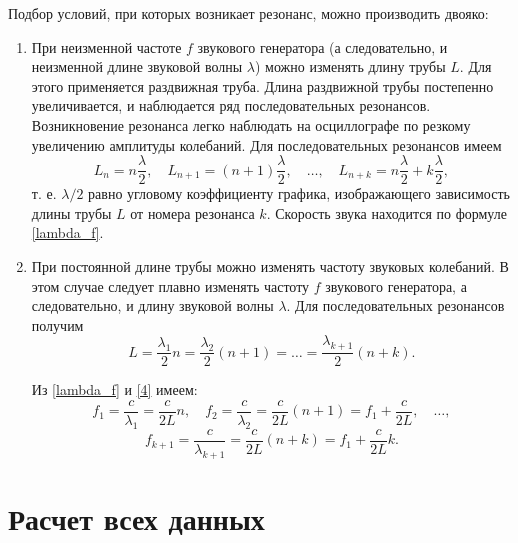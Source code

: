 \documentclass[a4paper, 12pt]{article}
\begin{document}
	Подбор условий, при которых возникает резонанс, можно производить двояко:
	\begin{enumerate}
		\item При неизменной частоте $ f $ звукового генератора (а следовательно, и неизменной длине звуковой волны $ \lambda $) можно изменять длину трубы $ L $. Для этого применяется раздвижная труба. Длина раздвижной трубы постепенно увеличивается, и наблюдается ряд последовательных резонансов. Возникновение резонанса легко наблюдать на осциллографе по резкому увеличению амплитуды колебаний. Для последовательных резонансов имеем \begin{equation}\label{first}
			L_n=n\frac{\lambda}{2}, \quad L_{n+1}=(n+1)\frac{\lambda}{2}, \quad \dots, \quad L_{n+k} = n\frac{\lambda}{2}+k\frac{\lambda}{2},
		\end{equation} т. е. $ \lambda/2 $ равно угловому коэффициенту графика, изображающего зависимость длины трубы $ L $ от номера резонанса $ k $. Скорость звука находится по формуле \eqref{lambda_f}.
		\item При постоянной длине трубы можно изменять частоту звуковых колебаний. В этом случае следует плавно изменять частоту $ f $ звукового генератора, а следовательно, и длину звуковой волны $ \lambda $. Для последовательных резонансов получим 
		\begin{equation}\label{4}
			L=\frac{\lambda_1}{2}n=\frac{\lambda_2}{2}(n+1)=\dots=\frac{\lambda_{k+1}}{2}(n+k).
		\end{equation}
		
		Из \eqref{lambda_f} и \eqref{4} имеем:
		\[ f_1=\frac{c}{\lambda_1}=\frac{c}{2L}n, \quad f_2=\frac{c}{\lambda_2}=\frac{c}{2L}(n+1)=f_1+\frac{c}{2L},\quad \dots, \]
		\begin{equation}\label{5}
			f_{k+1}=\frac{c}{\lambda_{k+1}}=\frac{c}{2L}(n+k)=f_1+\frac{c}{2L}k.
		\end{equation}
	\end{enumerate}    

\section{Расчет всех данных}
\end{document}
